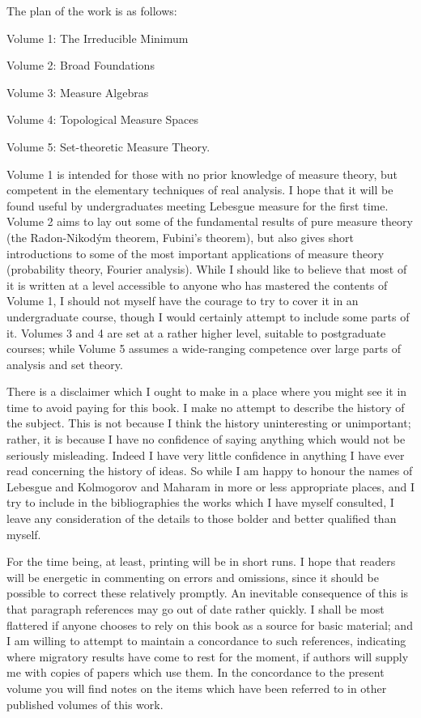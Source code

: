 The plan of the work is as follows:
     
\medskip
     
\qquad\qquad Volume 1:  The Irreducible Minimum
     
\qquad\qquad Volume 2:  Broad Foundations
     
\qquad\qquad Volume 3:  Measure Algebras
     
\qquad\qquad Volume 4:  Topological Measure Spaces
     
\qquad\qquad Volume 5:  Set-theoretic Measure Theory.
     
\medskip
     
\noindent Volume 1 is intended for those with no prior knowledge of
measure theory, but competent in the elementary techniques of real
analysis.  I hope that it will be found useful by undergraduates meeting
Lebesgue measure for the first time.    Volume 2 aims to lay out some of
the fundamental results of pure measure theory (the
Radon-Nikod\'ym theorem, Fubini's theorem), but also gives short
introductions to some of the most important applications of measure
theory (probability theory, Fourier analysis).   While I should like to
believe that most of it is written at a level accessible to anyone who
has mastered the contents of Volume 1, I should not myself have the
courage to try to cover it in an undergraduate course, though I would
certainly attempt to include some parts of it.   Volumes 3 and 4 are
set at a rather higher level, suitable to postgraduate courses;  while
Volume 5 assumes a wide-ranging competence over large parts of
analysis and set theory.
     
There is a disclaimer which I ought to make in a place where you might
see it in time to avoid paying for this book.   I make no attempt to
describe the history of the subject.   This is not because I think the
history uninteresting or unimportant;  rather, it is because I have no
confidence of saying anything which would not be seriously misleading.
Indeed I have very little confidence in anything I have ever read
concerning the history of ideas.   So while I am happy to honour the
names of Lebesgue and Kolmogorov and Maharam in more or less appropriate
places, and I try to include in the bibliographies the works which I
have myself consulted, I leave any consideration of the details to those
bolder and better qualified than myself.
     
For the time being, at
least, printing will be in short runs.   I hope that readers will be
energetic in commenting on errors and omissions, since it should be
possible to correct these relatively promptly.   An inevitable
consequence of this is that paragraph references may go out of date
rather quickly.   I shall be most flattered if anyone chooses to rely on
this book as a source for basic material;  and I am willing to attempt
to maintain a concordance to such references, indicating where migratory
results have come to rest for the moment, if authors will supply me with
copies of papers which use them.   In the concordance to the present 
volume you will find notes on the items which have been referred to in
other published volumes of this work.
     
